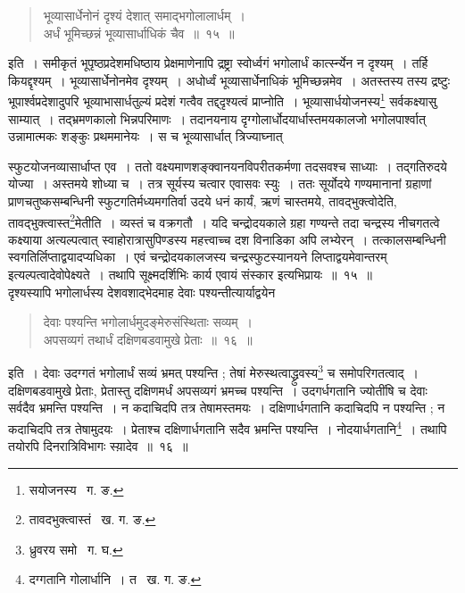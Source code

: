 \documentclass[11pt, openany]{book}
\begin{document}
\begin{quote}
{\ab भूव्यासार्धेनोनं दृश्यं देशात् समाद्भगोलालार्धम्~। \\
 अर्धं भूमिच्छन्नं भूव्यासार्धाधिकं चैव~॥~१५~॥} 
\end{quote}

\indent इति~। समीकृतं भूपृष्ठप्रदेशमधिष्ठाय प्रेक्षमाणेनापि द्रष्ट्रा स्वोर्ध्वगं भगोलार्धं कार्त्स्न्येन न दृश्यम्~। तर्हि कियद्दृश्यम्~। भूव्यासार्धेनोनमेव दृश्यम्~। अधोर्ध्वं भूव्यासार्धेनाधिकं भूमिच्छन्नमेव~। अतस्तस्य तस्य द्रष्टुः भूपार्श्वप्रदेशादुपरि भूव्याभासार्धतुल्यं प्रदेशं गत्वैव 
तद्द्दृश्यत्वं प्राप्नोति~। भूव्यासार्धयोजनस्य\renewcommand{\thefootnote}{३}\footnote{सयोजनस्य \textendash\ ग. ङ.} सर्वकक्ष्यासु साम्यात्~। तद्भ्रमणकालो भिन्नपरिमाणः~। तदानयनाय दृग्गोलार्धोदयार्धास्तमयकालजो भगोलपार्श्वात् उन्नामात्मकः शङ्कुः प्रथममानेयः~। स च भूव्यासार्धात् त्रिज्याघ्नात् 

\newpage

\noindent स्फुटयोजनव्यासार्धाप्त एव~। ततो वक्ष्यमाणशङ्क्वानयनविपरीतकर्मणा तदसवश्च साध्याः~। तद्गतिरुदये योज्या~। अस्तमये शोध्या च~। तत्र सूर्यस्य चत्वार एवासवः स्युः~। ततः सूर्योदये गण्यमानानां ग्रहाणां प्राणचतुष्कसम्बन्धिनी स्फुटगतिर्मध्यमगतिर्वा उदये धनं
कार्यं, ऋणं  चास्तमये, तावद्भुक्त्वोदेति, तावद्भुक्त्वास्त\renewcommand{\thefootnote}{१}\footnote{तावदभुक्त्वास्तं \textendash\ ख. ग. ङ.}मेतीति~। व्यस्तं च वक्रगतौ~। यदि चन्द्रोदयकाले ग्रहा गण्यन्ते तदा चन्द्रस्य नीचगतत्वे कक्ष्याया अत्यल्पत्वात् स्वाहोरात्रासुपिण्डस्य महत्त्वाच्च दश विनाडिका अपि लभ्येरन्~। तत्कालसम्बन्धिनी स्वगतिर्लिप्ताद्वयादप्यधिका~। एवं चन्द्रोदयकालजस्य चन्द्रस्फुटस्यानयने लिप्ताद्वयमेवान्तरम् इत्यल्पत्वादेवोपेक्ष्यते~। तथापि सूक्ष्मदर्शिभिः कार्य एवायं संस्कार इत्यभिप्रायः~॥~१५~॥ \\

\indent दृश्यस्यापि भगोलार्धस्य देशवशाद्भेदमाह देवाः पश्यन्तीत्यार्याद्वयेन\textendash 
\begin{quote}
{\ab देवाः पश्यन्ति भगोलार्धमुदङ्मेरुसंस्थिताः सव्यम्~। \\
 अपसव्यगं तथार्धं दक्षिणबडवामुखे प्रेताः~॥~१६~॥} 
\end{quote}

\indent इति~। देवाः उदग्गतं भगोलार्धं सव्यं भ्रमत् पश्यन्ति ; तेषां मेरुस्थत्वाद्ध्रुवस्य\renewcommand{\thefootnote}{२}\footnote{ध्रुवरय समो \textendash\ ग. घ.} च समोपरिगतत्वाद्~। 
दक्षिणबडवामुखे प्रेताः, प्रेतास्तु दक्षिणमर्धं अपसव्यगं भ्रमच्च पश्यन्ति~। उदगर्धगतानि ज्योतींषि च देवाः सर्वदैव भ्रमन्ति पश्यन्ति~। न कदाचिदपि तत्र तेषामस्तमयः~। दक्षिणार्धगतानि कदाचिदपि न पश्यन्ति ; न कदाचिदपि तत्र तेषामुदयः~। प्रेताश्च दक्षिणार्धगतानि सदैव भ्रमन्ति पश्यन्ति~। नोदयार्धगतानि\renewcommand{\thefootnote}{३}\footnote{दग्गतानि गोलार्धानि~। त \textendash\ ख. ग. ङ.}~। तथापि तयोरपि दिनरात्रिविभागः स्य़ादेव~॥~१६~॥ \\
\end{document}
